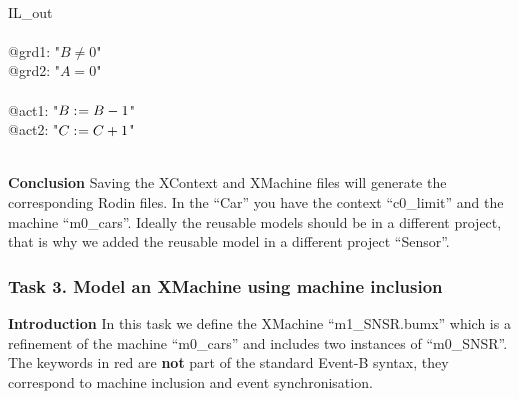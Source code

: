 \begin{description}
\begin{center}
\begin{Bcode}
			\Btab \Bend\\
			\Btab IL_out\\
			\Btab \Bwhen\\
			\Btab \Btab @grd1: "\(B \neq 0\)"\\
			\Btab \Btab @grd2: "\(A = 0\)"\\
			\Btab \Bthen\\
			\Btab \Btab @act1: "\(B \mathrel{:\mkern1mu=} B - 1\)"\\
			\Btab \Btab @act2: "\(C \mathrel{:\mkern1mu=} C + 1\)"\\
			\Btab \Bend\\
			\Bend
			\fi
		\end{Bcode}
	\end{center}
	
\end{description}
\textbf{Conclusion} Saving the XContext and XMachine files will generate the corresponding Rodin files. In the ``Car'' you have the context ``c0\_limit'' and the machine ``m0\_cars''. Ideally the reusable models should be in a different project, that is why we added the reusable model in a different project ``Sensor''.

\subsubsection{Task 3. Model an XMachine using machine inclusion}
\textbf{Introduction} In this task we define the XMachine ``m1\_SNSR.bumx'' which is a refinement of the machine ``m0\_cars'' and includes two instances of ``m0\_SNSR''. The keywords in red  are \textbf{not} part of the standard Event-B syntax, they correspond to machine inclusion and event synchronisation. 

